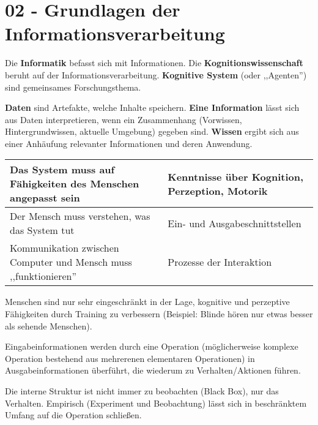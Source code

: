 \section{02 - Grundlagen der Informationsverarbeitung}

Die \textbf{Informatik} befasst sich mit Informationen. Die
\textbf{Kognitionswissenschaft} beruht auf der Informationsverarbeitung.
\textbf{Kognitive System} (oder ,,Agenten'') sind gemeinsames Forschungsthema.

\textbf{Daten} sind Artefakte, welche Inhalte speichern. \textbf{Eine Information}
lässt sich aus Daten interpretieren, wenn ein Zusammenhang (Vorwissen, Hintergrundwissen,
aktuelle Umgebung) gegeben sind. \textbf{Wissen} ergibt sich aus einer Anhäufung
relevanter Informationen und deren Anwendung.

\begin{tabular}{|p{20em}|p{15em}|}
\hline
Das System muss auf Fähigkeiten des Menschen angepasst sein
& Kenntnisse über Kognition, Perzeption, Motorik\\ \hline

Der Mensch muss verstehen, was das System tut
& Ein- und Ausgabeschnittstellen \\ \hline

Kommunikation zwischen Computer und Mensch muss ,,funktionieren''
& Prozesse der Interaktion\\ \hline
\end{tabular}

Menschen sind nur sehr eingeschränkt in der Lage, kognitive und perzeptive Fähigkeiten
durch Training zu verbessern (Beispiel: Blinde hören nur etwas besser als sehende Menschen).

Eingabeinformationen werden durch eine Operation (möglicherweise komplexe Operation bestehend
aus mehrerenen elementaren Operationen) in Ausgabeinformationen überführt, die wiederum zu
Verhalten/Aktionen führen.

Die interne Struktur ist nicht immer zu beobachten (Black Box), nur das Verhalten. Empirisch
(Experiment und Beobachtung) lässt sich in beschränktem Umfang auf die Operation schließen.
